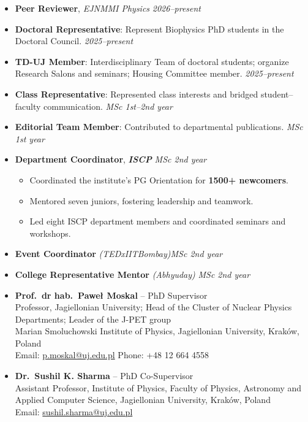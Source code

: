 \noindent {}
\begin{itemize}
    \item \textbf{Peer Reviewer}, \emph{EJNMMI Physics} \hfill \emph{2026--present}
    \item \textbf{Doctoral Representative}: Represent Biophysics PhD students in the Doctoral Council. \hfill \emph{2025--present}
    \item \textbf{TD-UJ Member}: Interdisciplinary Team of doctoral students; organize Research Salons and seminars; Housing Committee member. \hfill \emph{2025--present}
    \item \textbf{Class Representative}: Represented class interests and bridged student--faculty communication. \hfill \emph{MSc 1st--2nd year}
    \item \textbf{Editorial Team Member}: Contributed to departmental publications. \hfill \emph{MSc 1st year}
    \item \textbf{Department Coordinator}, \textbf{\emph{ISCP}} \hfill \emph{MSc 2nd year}
    \begin{itemize}
        \item Coordinated the institute's PG Orientation for \textbf{1500+ newcomers}.
        \item Mentored seven juniors, fostering leadership and teamwork.
        \item Led eight ISCP department members and coordinated seminars and workshops.
    \end{itemize}
\end{itemize}

\noindent {}
\begin{itemize}
    \item \textbf{Event Coordinator} \emph{(TEDxIITBombay)}\hfill \emph{MSc 2nd year}
    \item \textbf{College Representative Mentor} \emph{(Abhyuday)} \hfill \emph{MSc 2nd year}
\end{itemize}


\noindent {}
\begin{itemize}
\item \textbf{Prof.\ dr hab.\ Pawe{\l} Moskal} -- PhD Supervisor\\
Professor, Jagiellonian University; Head of the Cluster of Nuclear Physics Departments; Leader of the J-PET group\\
Marian Smoluchowski Institute of Physics, Jagiellonian University, Krak{\'o}w, Poland\\
Email: \href{mailto:p.moskal@uj.edu.pl}{p.moskal@uj.edu.pl} \quad Phone: +48 12 664 4558
\item \textbf{Dr.\ Sushil K. Sharma} -- PhD Co-Supervisor\\
Assistant Professor, Institute of Physics, Faculty of Physics, Astronomy and Applied Computer Science, Jagiellonian University, Krak{\'o}w, Poland\\
Email: \href{mailto:sushil.sharma@uj.edu.pl}{sushil.sharma@uj.edu.pl}
\end{itemize}
